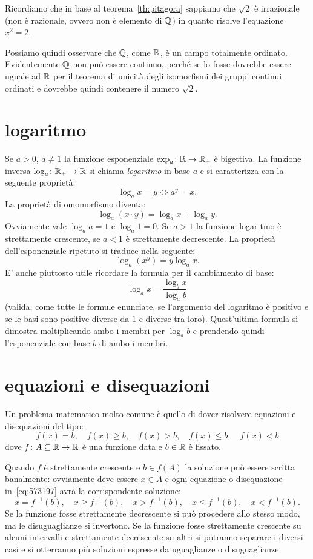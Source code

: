 Ricordiamo che in base al teorema~\ref{th:pitagora} sappiamo 
che $\sqrt 2$ è irrazionale 
(non è razionale, ovvero non è elemento di ${\mathbb Q}$)
in quanto risolve l'equazione $x^2=2$.

Possiamo quindi osservare che ${\mathbb Q}$, come ${\mathbb R}$, è un campo totalmente 
ordinato.
Evidentemente ${\mathbb Q}$ non può essere continuo, perché se lo fosse 
dovrebbe essere uguale ad ${\mathbb R}$ per il teorema di unicità degli 
isomorfismi dei gruppi continui ordinati e dovrebbe quindi 
contenere il numero $\sqrt 2$. 

\section{logaritmo}
%
Se $a>0$, $a\neq 1$ la funzione esponenziale 
$\exp_a\colon {\mathbb R} \to {\mathbb R}_+$ è bigettiva. 
La funzione inversa $\log_a\colon {\mathbb R}_+\to {\mathbb R}$ si chiama \emph{logaritmo}%
%
 in base $a$ 
e si caratterizza con la seguente proprietà:
\[
  \log_a x = y \iff a^y = x.
\]
La proprietà di omomorfismo diventa:
\[
  \log_a(x\cdot y) =  \log_a x + \log_a y.
\]
Ovviamente vale $\log_a a = 1$ e $\log_a 1 = 0$.
Se $a>1$ la funzione logaritmo è strettamente crescente, se $a<1$ è strettamente decrescente.
La proprietà dell'esponenziale ripetuto si traduce nella seguente:
\[
  \log_a (x^y) = y \log_a x.
\]
E' anche piuttosto utile ricordare la formula per il cambiamento di base:
\[
\log_a x = \frac{\log_b x}{\log_a b}
\]
(valida, come tutte le formule enunciate, se l'argomento del logaritmo 
è positivo e se le basi sono positive diverse da $1$ e diverse tra loro).
Quest'ultima formula si dimostra moltiplicando ambo i membri per $\log_a b$ 
e prendendo quindi l'esponenziale con base $b$ di ambo i membri.


\section{equazioni e disequazioni}

Un problema matematico molto comune è quello di dover risolvere 
equazioni e disequazioni del tipo:
\begin{equation}\label{eq:573197}
  f(x) = b, \quad f(x) \ge b, \quad f(x) > b, 
  \quad f(x) \le b, \quad f(x) < b
\end{equation}
dove $f\colon A \subseteq {\mathbb R} \to{\mathbb R}$ è una funzione data e 
$b\in {\mathbb R}$ è fissato.

Quando $f$ è strettamente crescente e $b\in f(A)$ 
la soluzione può essere 
scritta banalmente: 
ovviamente deve essere $x\in A$
e ogni equazione o disequazione in~\eqref{eq:573197}
avrà la corrispondente soluzione:
\[
  x= f^{-1}(b), \quad x \ge f^{-1}(b), \quad x>f^{-1}(b),
  \quad x \le f^{-1}(b), \quad x < f^{-1}(b).
\]
Se la funzione fosse strettamente decrescente 
si può procedere allo stesso modo, ma le disuguaglianze si invertono.
Se la funzione fosse strettamente crescente su alcuni intervalli 
e strettamente decrescente su altri si potranno separare i diversi 
casi e si otterranno più soluzioni espresse da uguaglianze
o disuguaglianze.

